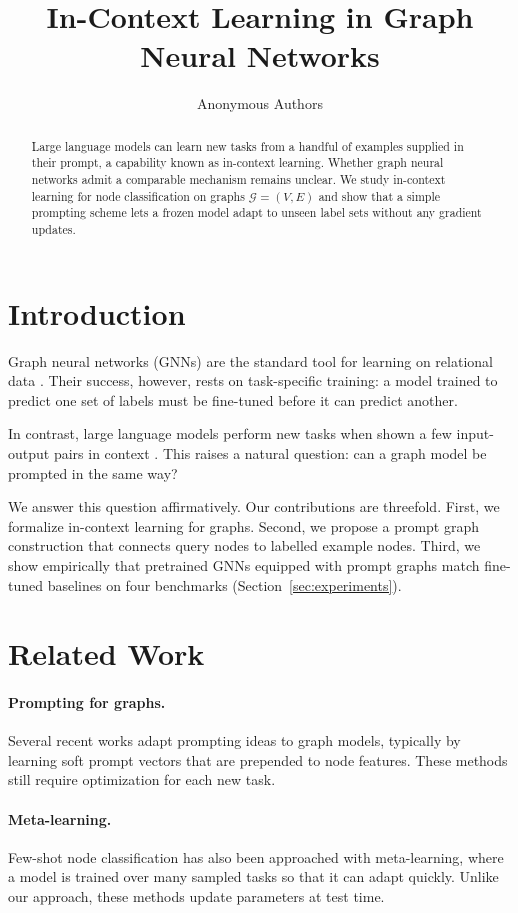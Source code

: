 \documentclass[11pt]{article}
\title{In-Context Learning in Graph Neural Networks}
\author{Anonymous Authors}
\newcommand{\G}{\mathcal{G}}
\begin{document}
\maketitle

\begin{abstract}
Large language models can learn new tasks from a handful of examples supplied in their prompt, a capability known as in-context learning. Whether graph neural networks admit a comparable mechanism remains unclear. We study in-context learning for node classification on graphs $\G = (V, E)$ and show that a simple prompting scheme lets a frozen model adapt to unseen label sets without any gradient updates.
\end{abstract}

\section{Introduction}\label{sec:intro}
Graph neural networks (GNNs) are the standard tool for learning on relational data \cite{kipf2017gcn, velickovic2018gat}. Their success, however, rests on task-specific training: a model trained to predict one set of labels must be fine-tuned before it can predict another.

In contrast, large language models perform new tasks when shown a few input-output pairs in context \cite{brown2020gpt3}. This raises a natural question: can a graph model be prompted in the same way?

We answer this question affirmatively. Our contributions are threefold. First, we formalize in-context learning for graphs. Second, we propose a prompt graph construction that connects query nodes to labelled example nodes. Third, we show empirically that pretrained GNNs equipped with prompt graphs match fine-tuned baselines on four benchmarks (Section~\ref{sec:experiments}).

\section{Related Work}
\paragraph{Prompting for graphs.} Several recent works adapt prompting ideas to graph models, typically by learning soft prompt vectors that are prepended to node features. These methods still require optimization for each new task.

\paragraph{Meta-learning.} Few-shot node classification has also been approached with meta-learning, where a model is trained over many sampled tasks so that it can adapt quickly. Unlike our approach, these methods update parameters at test time.
\end{document}

